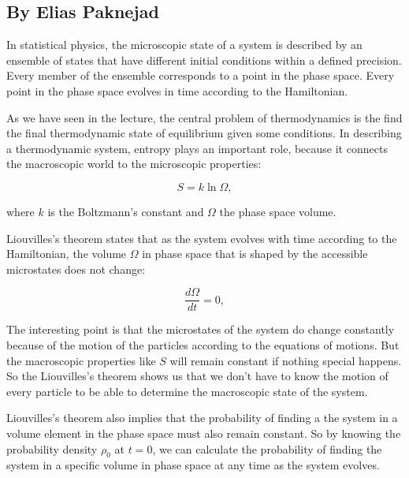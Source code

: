 
\subsection{By Elias Paknejad}

In statistical physics, the microscopic state of a system is described by an ensemble of states that have different initial conditions within a defined precision. Every member of the ensemble corresponds to a point in the phase space. Every point in the phase space evolves in time according to the Hamiltonian.

As we have seen in the lecture, the central problem of thermodynamics is the find the final thermodynamic state of equilibrium given some conditions. In describing a thermodynamic system, entropy plays an important role, because it connects the  macroscopic world to the microscopic properties:

\begin{equation}
S = k \ln{\Omega},
\end{equation}

where $k$ is the Boltzmann's constant and $\Omega$ the phase space volume.

Liouvilles's theorem states that as the system evolves with time according to the Hamiltonian, the volume $\Omega$ in phase space that is shaped by the accessible microstates does not change:

\begin{equation}
\frac{d\Omega}{dt} = 0,
\end{equation}


The interesting point is that the microstates of the system do change constantly because of the motion of the particles according to the equations of motions. But the macroscopic properties like $S$ will remain constant if nothing special happens. So the Liouvilles's theorem shows us that we don't have to know the motion of every particle to be able to determine the macroscopic state of the system. 

Liouvilles's theorem  also implies that the probability of finding a the system in a volume element in the phase space must also remain constant. So by knowing the probability density $\rho_0$ at $t=0$, we can calculate the probability of finding the system in a specific volume in phase space at any time as the system evolves.
